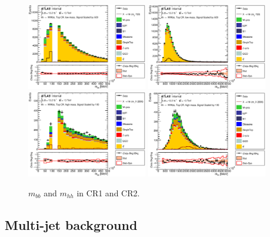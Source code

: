 \begin{figure}[!h]
\begin{center}
\includegraphics*[width=0.47\textwidth] {chapters/dihiggs/figures/ControlPlots/CR1/C_mBBcr_opt700_bbpt150_bbMass.eps}
\includegraphics*[width=0.47\textwidth] {chapters/dihiggs/figures/ControlPlots/CR1/C_mBBcr_opt700_bbpt150_hhMass.eps}
\includegraphics*[width=0.47\textwidth] {chapters/dihiggs/figures/ControlPlots/CR2/C_mBBcr_opt2000_bbpt350_bbMass.eps}
\includegraphics*[width=0.47\textwidth] {chapters/dihiggs/figures/ControlPlots/CR2/C_mBBcr_opt2000_bbpt350_hhMass.eps}
\caption[$m_{bb}$ and $m_{hh}$ in CR1 and CR2.]{$m_{bb}$ and $m_{hh}$ in CR1 and CR2.  }
\label{fig:mbb_mhh}
\end{center}
\end{figure}
\clearpage

\subsection{Multi-jet background}



\clearpage


